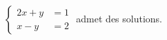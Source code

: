 $\begin{cases}2x+y &= 1 \\ x-y &= 2\end{cases}$ admet des solutions.

\begin{reponses}
\end{reponses}

